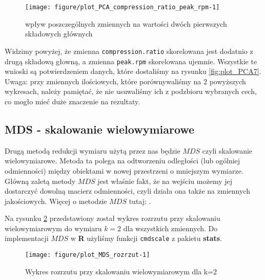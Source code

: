 \documentclass[12pt, a4paper]{article}\usepackage[]{graphicx}\usepackage[]{xcolor}
\makeatletter
\def\maxwidth{ %
  \ifdim\Gin@nat@width>\linewidth
    \linewidth
  \else
    \Gin@nat@width
  \fi
}
\newenvironment{knitrout}{}{} %
\makeatother
\begin{document}
\begin{knitrout}
\color{fgcolor}\begin{figure}[H]

{\centering \texttt{[image: figure/plot\_PCA\_compression\_ratio\_peak\_rpm-1]} 

}

\caption[wpływ poszczególnych zmiennych na wartości dwóch pierwszych składowych głównych]{wpływ poszczególnych zmiennych na wartości dwóch pierwszych składowych głównych}\label{fig:plot_PCA_compression.ratio_peak.rpm}
\end{figure}

\end{knitrout}
Widzimy powyżej, że zmienna \texttt{compression.ratio} skorelowana jest dodatnio z drugą składową głowną, a zmienna \texttt{peak.rpm} skorelowana ujemnie. Wszystkie te wnioski są potwierdzeniem danych, które dostaliśmy na rysunku \ref{fig:plot_PCA7}. Uwaga: przy zmiennych ilościowych, które porównywaliśmy na $2$ powyższych wykresach, należy pamiętać, że nie usuwaliśmy ich z podzbioru wybranych cech, co mogło mieć duże znaczenie na rezultaty.


\subsection{MDS - skalowanie wielowymiarowe}

Drugą metodą redukcji wymiaru użytą przez nas będzie $MDS$ czyli skalowanie wielowymiarowe. Metoda ta polega na odtworzeniu odległości (lub ogólniej odmienności) między obiektami w nowej przestrzeni o mniejszym wymiarze. Główną zaletą metody $MDS$ jest właśnie fakt, że na wejściu możemy jej dostarczyć dowolną macierz odmienności, czyli działa ona także na zmiennych jakościowych. Więcej o metodzie $MDS$ tutaj: \cite{MDS}.
\par Na rysunku \ref{fig:plot_MDS_rozrzut} przedstawiony został wykres rozrzutu przy skalowaniu wielowymiarowym do wymiaru $k=2$ dla wszystkich zmiennych. Do implementacji $MDS$ w \textbf{R} użyliśmy funkcji \texttt{cmdscale} \cite{cmdscale} z pakietu \textbf{stats}.



\begin{knitrout}
\color{fgcolor}\begin{figure}[H]

{\centering \texttt{[image: figure/plot\_MDS\_rozrzut-1]} 

}

\caption[Wykres rozrzutu przy skalowaniu wielowymiarowym dla k=2]{Wykres rozrzutu przy skalowaniu wielowymiarowym dla k=2}\label{fig:plot_MDS_rozrzut}
\end{figure}

\end{knitrout}
\end{document}
